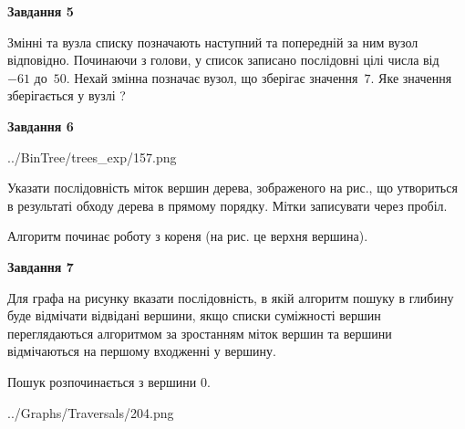 \documentclass[12pt, ukrainian]{article}
\begin{document}
{\begin {large}
{\begin {center}\textbf{Завдання 5}\end {center}}\par
Змінні  та  вузла списку позначають наступний та попередній за ним вузол відповідно. Починаючи з голови, у список записано послідовні цілі числа від~$-61$ до~$50$. Нехай змінна  позначає вузол, що зберігає значення~$7$.
Яке значення зберігається у вузлі  ?\par
\newpage

{\begin {center}\textbf{Завдання 6}\end {center}}\par

\begin{center}
	{../BinTree/trees_exp/157.png}
\end{center}
Указати послідовність міток вершин дерева, зображеного на рис., що утвориться в результаті обходу дерева в прямому порядку. Мітки записувати через пробіл.\par Алгоритм починає роботу з кореня (на рис. це верхня вершина).\par
\newpage

{\begin {center}\textbf{Завдання 7}\end {center}}\par
Для графа на рисунку вказати послідовність, в якій алгоритм пошуку в глибину буде відмічати відвідані вершини, якщо списки суміжності вершин переглядаються алгоритмом за зростанням міток вершин та вершини відмічаються на першому вход\-женні у вершину.\par
Пошук розпочинається з вершини 0.\par

\begin{center}
	{../Graphs/Traversals/204.png}
\end{center}\par
\newpage


\end{large}}
\end{document}
